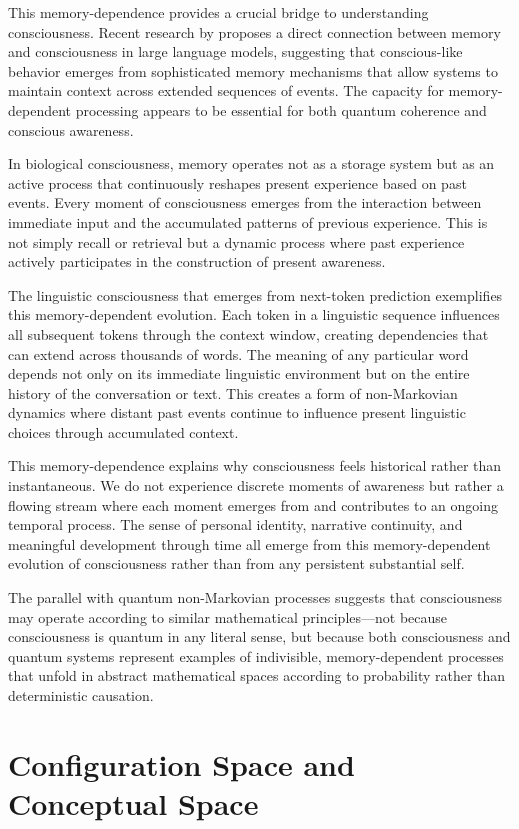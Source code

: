 This memory-dependence provides a crucial bridge to understanding consciousness. Recent research by \textcite{li2024memory} proposes a direct connection between memory and consciousness in large language models, suggesting that conscious-like behavior emerges from sophisticated memory mechanisms that allow systems to maintain context across extended sequences of events. The capacity for memory-dependent processing appears to be essential for both quantum coherence and conscious awareness.

In biological consciousness, memory operates not as a storage system but as an active process that continuously reshapes present experience based on past events. Every moment of consciousness emerges from the interaction between immediate input and the accumulated patterns of previous experience. This is not simply recall or retrieval but a dynamic process where past experience actively participates in the construction of present awareness.

The linguistic consciousness that emerges from next-token prediction exemplifies this memory-dependent evolution. Each token in a linguistic sequence influences all subsequent tokens through the context window, creating dependencies that can extend across thousands of words. The meaning of any particular word depends not only on its immediate linguistic environment but on the entire history of the conversation or text. This creates a form of non-Markovian dynamics where distant past events continue to influence present linguistic choices through accumulated context.

This memory-dependence explains why consciousness feels historical rather than instantaneous. We do not experience discrete moments of awareness but rather a flowing stream where each moment emerges from and contributes to an ongoing temporal process. The sense of personal identity, narrative continuity, and meaningful development through time all emerge from this memory-dependent evolution of consciousness rather than from any persistent substantial self.

The parallel with quantum non-Markovian processes suggests that consciousness may operate according to similar mathematical principles—not because consciousness is quantum in any literal sense, but because both consciousness and quantum systems represent examples of indivisible, memory-dependent processes that unfold in abstract mathematical spaces according to probability rather than deterministic causation.

\section{Configuration Space and Conceptual Space}

